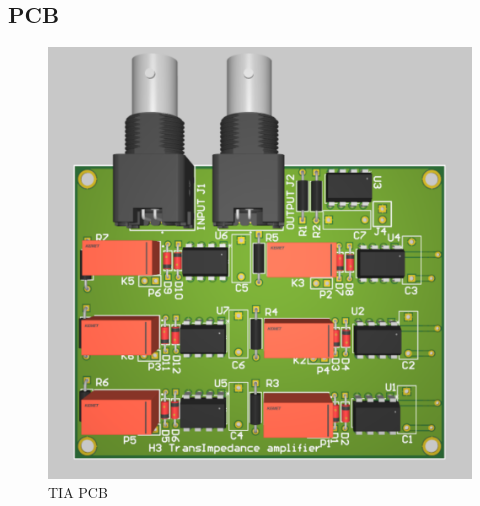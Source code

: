 \documentclass[conference]{IEEEtran}
\begin{document}
\subsection{PCB}

\begin{figure}
    \centering
    \includegraphics[width=\linewidth]{TIA_PCB_pic.png}
    \caption{TIA PCB}
    \label{fig:7}
\end{figure}
\end{document}
